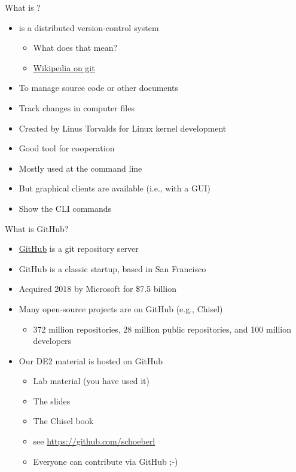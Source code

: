 \begin{frame}[fragile]{What is ?}
\begin{itemize}
\item {} is a distributed version-control system
\begin{itemize}
\item What does that mean?
\item \href{https://en.wikipedia.org/wiki/Git}{Wikipedia on git}
\end{itemize}
\item To manage source code or other documents
\item Track changes in computer files
\item Created by Linus Torvalds for Linux kernel development
\item Good tool for cooperation
\item Mostly used at the command line
\item But graphical clients are available (i.e., with a GUI)
\item Show the CLI commands
\end{itemize}
\end{frame}

\begin{frame}[fragile]{What is GitHub?}
\begin{itemize}
\item \href{https://github.com/}{GitHub} is a git repository server
\item GitHub is a classic startup, based in San Francisco
\item Acquired 2018 by Microsoft for \$7.5 billion
\item Many open-source projects are on GitHub (e.g., Chisel)
\begin{itemize}
\item 372 million repositories, 28 million public repositories, and 100 million developers
\end{itemize}
\item Our DE2 material is hosted on GitHub
\begin{itemize}
\item Lab material (you have used it)
\item The slides
\item The Chisel book
\item see \url{https://github.com/schoeberl}
\item Everyone can contribute via GitHub ;-)
\end{itemize}
\end{itemize}
\end{frame}


